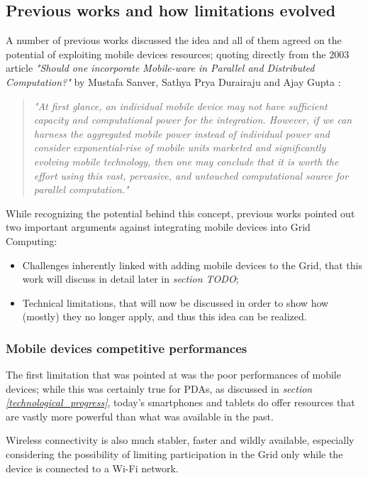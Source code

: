 \subsection{Previous works and how limitations evolved}
A number of previous works discussed the idea and all of them agreed on the potential of exploiting mobile devices resources; quoting directly from the 2003 article \textit{"Should one incorporate Mobile-ware in Parallel and Distributed Computation?"} by Mustafa Sanver, Sathya Prya Durairaju and Ajay Gupta \cite{should_one_incorporate_mobile_ware}:
\begin{quotation}
    \textit{"At first glance, an individual mobile device may not have sufficient capacity and computational power for the integration. However, if we can harness the aggregated mobile power instead of individual power and consider exponential-rise of mobile units marketed and significantly evolving mobile technology, then one may conclude that it is worth the effort using this vast, pervasive, and untouched computational source for parallel computation."}
\end{quotation}

While recognizing the potential behind this concept, previous works pointed out two important arguments against integrating mobile devices into Grid Computing:
\begin{itemize}
    \item Challenges inherently linked with adding mobile devices to the Grid, that this work will discuss in detail later in \textit{section TODO};
    \item Technical limitations, that will now be discussed in order to show how (mostly) they no longer apply, and thus this idea can be realized.
\end{itemize}

\subsubsection{Mobile devices competitive performances}
The first limitation that was pointed at was the poor performances of mobile devices; while this was certainly true for PDAs, as discussed in \textit{section \ref{technological_progress}}, today's smartphones and tablets do offer resources that are vastly more powerful than what was available in the past.

Wireless connectivity is also much stabler, faster and wildly available, especially considering the possibility of limiting participation in the Grid only while the device is connected to a Wi-Fi network.

